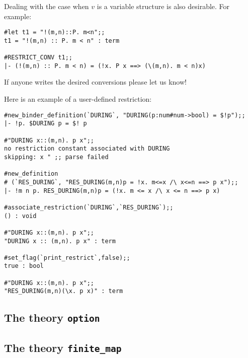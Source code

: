 \begin{hol}
{\small\verb%   RES_FORALL %}$P${\small\verb% (\%}$v$\ml{.}$B$\ml{[}$v$\ml{])  ---->  !}$v$\ml{. }$P$ $v$\ml{ ==> }$B$\ml{[}$v$\ml{]}
\end{hol}

\noindent Dealing with the case when
$v$ is a variable structure is also desirable. For example:

\begin{session}\begin{verbatim}
#let t1 = "!(m,n)::P. m<n";;
t1 = "!(m,n) :: P. m < n" : term

#RESTRICT_CONV t1;;
|- (!(m,n) :: P. m < n) = (!x. P x ==> (\(m,n). m < n)x)

\end{verbatim}\end{session}

\noindent If anyone writes the desired conversions please let us know!

Here is an example of a user-defined restriction:

\begin{session}\begin{verbatim}
#new_binder_definition(`DURING`, "DURING(p:num#num->bool) = $!p");;
|- !p. $DURING p = $! p

#"DURING x::(m,n). p x";;
no restriction constant associated with DURING
skipping: x " ;; parse failed

#new_definition
# (`RES_DURING`, "RES_DURING(m,n)p = !x. m<=x /\ x<=n ==> p x");;
|- !m n p. RES_DURING(m,n)p = (!x. m <= x /\ x <= n ==> p x)

#associate_restriction(`DURING`,`RES_DURING`);;
() : void

#"DURING x::(m,n). p x";;
"DURING x :: (m,n). p x" : term

#set_flag(`print_restrict`,false);;
true : bool

#"DURING x::(m,n). p x";;
"RES_DURING(m,n)(\x. p x)" : term
\end{verbatim}\end{session}



\subsection{The theory {\tt option}}
\subsection{The theory {\tt finite\_map}}
